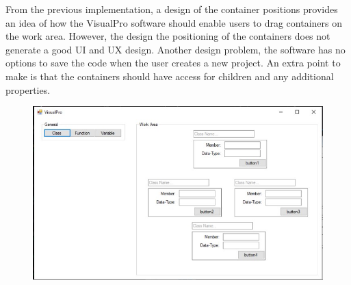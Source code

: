 \documentclass[12pt]{report} %
\begin{document}
			From the previous implementation, a design of the container positions provides an idea of how the VisualPro software should enable users to drag containers on the work area. However, the design the positioning of the containers does not generate a good UI and UX design. Another design problem, the software has no options to save the code when the user creates a new project. An extra point to make is that the containers should have access for children and any additional properties.
			\begin{figure}[H]
				{\includegraphics[scale=0.45]{Figures/vp-designs/NET_Framework-GUI-2-1.jpg}}
			\end{figure}
\end{document}
